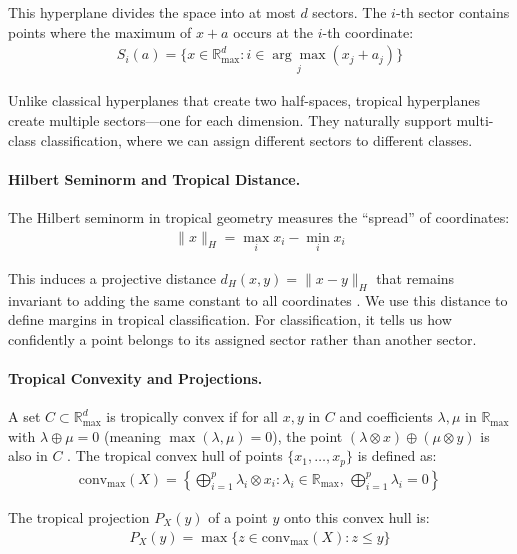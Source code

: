 \documentclass{article}
\newcommand{\Rmax}{\mathbb{R}_{\max}}
\begin{document}
This hyperplane divides the space into at most $d$ sectors. The $i$-th sector contains points where the maximum of $x + a$ occurs at the $i$-th coordinate:
\begin{align}
S_i(a) = \{x \in \Rmax^d : i \in \underset{j}{\arg\max} (x_j + a_j)\}
\end{align}

Unlike classical hyperplanes that create two half-spaces, tropical hyperplanes create multiple sectors—one for each dimension. They naturally support multi-class classification, where we can assign different sectors to different classes.

\paragraph{Hilbert Seminorm and Tropical Distance.}
The Hilbert seminorm in tropical geometry measures the ``spread'' of coordinates:
\begin{align}
\|x\|_H = \max_i x_i - \min_i x_i
\end{align}

This induces a projective distance $d_H(x,y) = \|x - y\|_H$ that remains invariant to adding the same constant to all coordinates \cite{cohen2004}. We use this distance to define margins in tropical classification. For classification, it tells us how confidently a point belongs to its assigned sector rather than another sector.

\paragraph{Tropical Convexity and Projections.}
A set $C \subset \Rmax^d$ is tropically convex if for all $x,y$ in $C$ and coefficients $\lambda,\mu$ in $\Rmax$ with $\lambda \oplus \mu = 0$ (meaning $\max(\lambda,\mu)=0$), the point $(\lambda \otimes x) \oplus (\mu \otimes y)$ is also in $C$ \cite{develin2004}. The tropical convex hull of points $\{x_1,\ldots,x_p\}$ is defined as:
\begin{align}
\text{conv}_{\max}(X) = \left\{\bigoplus_{i=1}^p \lambda_i \otimes x_i : \lambda_i \in \Rmax,\, \bigoplus_{i=1}^p \lambda_i = 0 \right\}
\end{align}

The tropical projection $P_X(y)$ of a point $y$ onto this convex hull is:
\begin{align}
P_X(y) = \max\{z \in \text{conv}_{\max}(X) : z \leq y\}
\end{align}
\end{document}
